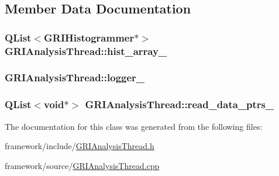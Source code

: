 \subsection{\-Member \-Data \-Documentation}
\hypertarget{classGRIAnalysisThread_ab42ada68a0de30979eea4443586706ff}{
\subsubsection[{hist\-\_\-array\-\_\-}]{\setlength{\rightskip}{0pt plus 5cm}\-Q\-List$<${\bf \-G\-R\-I\-Histogrammer}$\ast$$>$ {\bf \-G\-R\-I\-Analysis\-Thread\-::hist\-\_\-array\-\_\-}}}\label{classGRIAnalysisThread_ab42ada68a0de30979eea4443586706ff}
\hypertarget{classGRIAnalysisThread_a1069f7fb1b6dd01e0da864a85748c83f}{
\subsubsection[{logger\-\_\-}]{ {\bf \-G\-R\-I\-Analysis\-Thread\-::logger\-\_\-}}}\label{classGRIAnalysisThread_a1069f7fb1b6dd01e0da864a85748c83f}
\hypertarget{classGRIAnalysisThread_af79d2707cdbc93665ff4e69ace5532b6}{
\subsubsection[{read\-\_\-data\-\_\-ptrs\-\_\-}]{\setlength{\rightskip}{0pt plus 5cm}\-Q\-List$<$void$\ast$$>$ {\bf \-G\-R\-I\-Analysis\-Thread\-::read\-\_\-data\-\_\-ptrs\-\_\-}}}\label{classGRIAnalysisThread_af79d2707cdbc93665ff4e69ace5532b6}


\-The documentation for this class was generated from the following files\-:\begin{DoxyCompactItemize}
\item 
framework/include/\hyperlink{GRIAnalysisThread_8h}{\-G\-R\-I\-Analysis\-Thread.\-h}\item 
framework/source/\hyperlink{GRIAnalysisThread_8cpp}{\-G\-R\-I\-Analysis\-Thread.\-cpp}\end{DoxyCompactItemize}

